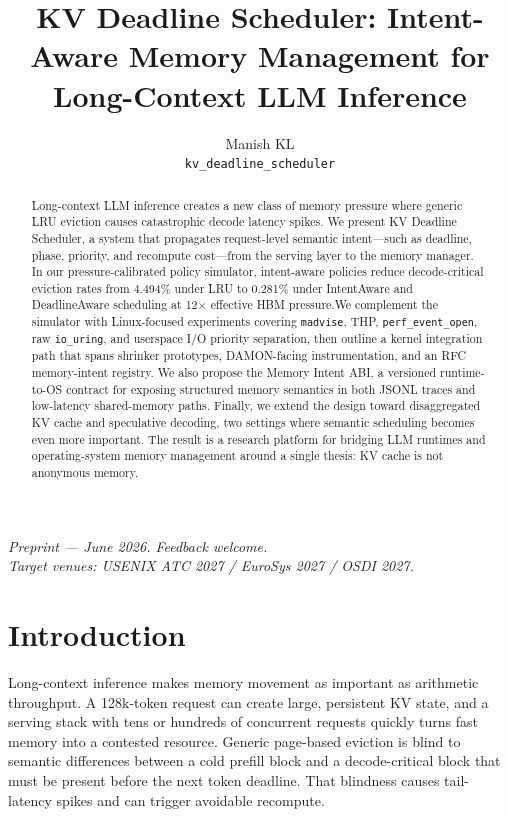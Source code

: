 \documentclass[10pt,twocolumn]{article}
\title{KV Deadline Scheduler: Intent-Aware Memory Management for Long-Context LLM Inference}
\author{Manish KL\\
\texttt{kv\_deadline\_scheduler}
}
\begin{document}
\maketitle

\begin{center}
\small
\textit{Preprint --- June 2026. Feedback welcome.}\\
\textit{Target venues: USENIX ATC 2027 / EuroSys 2027 / OSDI 2027.}
\end{center}

\begin{abstract}
Long-context LLM inference creates a new class of memory pressure where generic LRU eviction causes catastrophic decode latency spikes. We present KV Deadline Scheduler, a system that propagates request-level semantic intent---such as deadline, phase, priority, and recompute cost---from the serving layer to the memory manager. In our pressure-calibrated policy simulator, intent-aware policies reduce decode-critical eviction rates from 4.494\% under LRU to 0.281\% under IntentAware and DeadlineAware scheduling at 12$\times$ effective HBM pressure.\footnotemark[1] We complement the simulator with Linux-focused experiments covering \texttt{madvise}, THP, \texttt{perf\_event\_open}, raw \texttt{io\_uring}, and userspace I/O priority separation, then outline a kernel integration path that spans shrinker prototypes, DAMON-facing instrumentation, and an RFC memory-intent registry. We also propose the Memory Intent ABI, a versioned runtime-to-OS contract for exposing structured memory semantics in both JSONL traces and low-latency shared-memory paths. Finally, we extend the design toward disaggregated KV cache and speculative decoding, two settings where semantic scheduling becomes even more important. The result is a research platform for bridging LLM runtimes and operating-system memory management around a single thesis: KV cache is not anonymous memory.
\end{abstract}

\section{Introduction}
\label{sec:intro}

Long-context inference makes memory movement as important as arithmetic throughput. A 128k-token request can create large, persistent KV state, and a serving stack with tens or hundreds of concurrent requests quickly turns fast memory into a contested resource. Generic page-based eviction is blind to semantic differences between a cold prefill block and a decode-critical block that must be present before the next token deadline. That blindness causes tail-latency spikes and can trigger avoidable recompute.
\end{document}
